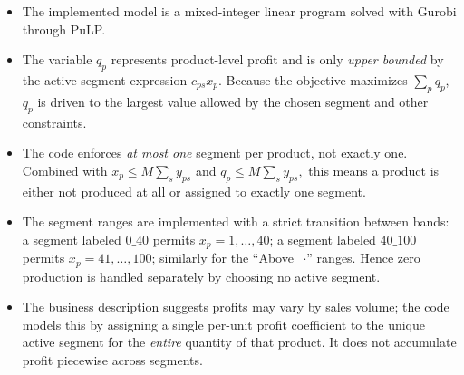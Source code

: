 \begin{itemize}
    \item The implemented model is a mixed-integer linear program solved with Gurobi through PuLP.
    \item The variable \(q_p\) represents product-level profit and is only \emph{upper bounded} by the active segment expression \(c_{ps}x_p\). Because the objective maximizes \(\sum_p q_p\), \(q_p\) is driven to the largest value allowed by the chosen segment and other constraints.
    \item The code enforces \emph{at most one} segment per product, not exactly one. Combined with
    \(
    x_p \le M\sum_s y_{ps}
    \)
    and
    \(
    q_p \le M\sum_s y_{ps},
    \)
    this means a product is either not produced at all or assigned to exactly one segment.
    \item The segment ranges are implemented with a strict transition between bands: a segment labeled \(0\_40\) permits \(x_p=1,\dots,40\); a segment labeled \(40\_100\) permits \(x_p=41,\dots,100\); similarly for the ``Above\_\(\cdot\)'' ranges. Hence zero production is handled separately by choosing no active segment.
    \item The business description suggests profits may vary by sales volume; the code models this by assigning a single per-unit profit coefficient to the unique active segment for the \emph{entire} quantity of that product. It does not accumulate profit piecewise across segments.
\end{itemize}

